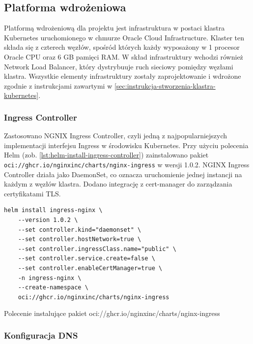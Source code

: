 \subsection{Platforma wdrożeniowa}\label{subsec:platforma-wdrozeniowa-kubernetes}

Platformą wdrożeniową dla projektu jest infrastruktura w postaci klastra Kubernetes uruchomionego w chmurze Oracle Cloud Infrastructure.
Klaster ten składa się z czterech węzłów, spośród których każdy wyposażony w 1 procesor Oracle CPU oraz 6 GB pamięci RAM\@.
W skład infrastruktury wchodzi również Network Load Balancer, który dystrybuuje ruch sieciowy pomiędzy węzłami klastra.
Wszystkie elementy infrastruktury zostały zaprojektowanie i wdrożone zgodnie z instrukcjami zawartymi w \autoref{sec:instrukcja-stworzenia-klastra-kubernetes}.

\subsubsection{Ingress Controller}\label{subsubsec:ingress-controller}

Zastosowano NGNIX Ingress Controller, czyli jedną z najpopularniejszych implementacji interfejsu Ingress w środowisku Kubernetes.
Przy użyciu polecenia Helm (zob. \autoref{lst:helm-install-ingress-controller}) zainstalowano pakiet \texttt{oci://ghcr.io/nginxinc/charts/nginx-ingress} w wersji 1.0.2.
NGINX Ingress Controller działa jako DaemonSet, co oznacza uruchomienie jednej instancji na każdym z węzłów klastra.
Dodano integrację z cert-manager do zarządzania certyfikatami TLS\@.

\begin{listing}[H]
    \begin{verbatim}
helm install ingress-nginx \
    --version 1.0.2 \
    --set controller.kind="daemonset" \
    --set controller.hostNetwork=true \
    --set controller.ingressClass.name="public" \
    --set controller.service.create=false \
    --set controller.enableCertManager=true \
    -n ingress-nginx \
    --create-namespace \
    oci://ghcr.io/nginxinc/charts/nginx-ingress
    \end{verbatim}
    \caption{Polecenie instalujące pakiet oci://ghcr.io/nginxinc/charts/nginx-ingress}
    \label{lst:helm-install-ingress-controller}
\end{listing}

\newpage

\subsubsection{Konfiguracja DNS}\label{subsubsec:konfiguracja-dns}

